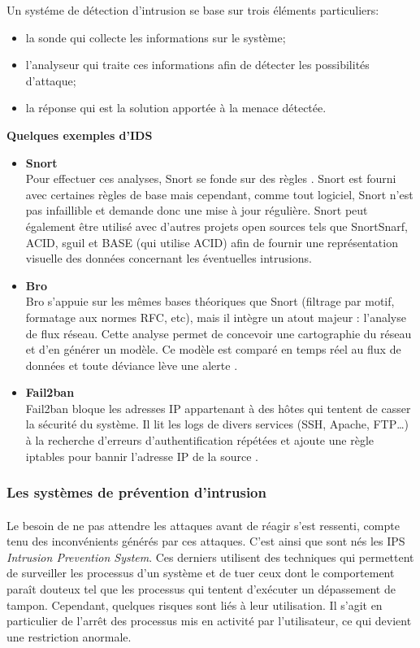     Un systéme de détection d'intrusion se base sur trois éléments particuliers:
    \begin{itemize}
      \item la sonde qui collecte les informations sur le système;
      \item l'analyseur qui traite ces informations afin de détecter les possibilités d'attaque;
      \item la réponse qui est la solution apportée à la menace détectée.
    \end{itemize}    

    \textbf{Quelques exemples d'IDS}
    
  \begin{itemize}
    \item \textbf{Snort}\\
      Pour effectuer ces analyses, Snort se fonde sur des règles \cite{d}. Snort est fourni avec certaines règles de base mais cependant, comme tout logiciel, Snort n'est pas infaillible et demande donc une mise à jour régulière. Snort peut également être utilisé avec d'autres projets open sources tels que SnortSnarf, ACID, sguil et BASE (qui utilise ACID) afin de fournir une représentation visuelle des données concernant les éventuelles intrusions.

    \item \textbf{Bro}\\
      Bro s'appuie sur les mêmes bases théoriques que Snort (filtrage par motif, formatage aux normes RFC, etc), mais il intègre un atout majeur : l'analyse de flux réseau. Cette analyse permet de concevoir une cartographie du réseau et d'en générer un modèle. Ce modèle est comparé en temps réel au flux de données et toute déviance lève une alerte \cite{h}.

    \item \textbf{Fail2ban}\\
      Fail2ban bloque les adresses IP appartenant à des hôtes qui tentent de casser la sécurité du système. Il lit les logs de divers services (SSH, Apache, FTP…) à la recherche d'erreurs d'authentification répétées et ajoute une règle iptables pour bannir l'adresse IP de la source \cite{i}.
  \end{itemize}

      \subsubsection{Les systèmes de prévention d'intrusion}
	\paragraph{} 
	  Le besoin de ne pas attendre les attaques avant de réagir s'est ressenti, compte tenu des inconvénients générés par ces attaques. C'est ainsi que sont nés les IPS \textit{Intrusion Prevention System}. Ces derniers utilisent des techniques qui permettent de surveiller les processus d’un système et de tuer ceux dont le comportement paraît douteux tel que les processus qui tentent d’exécuter un dépassement de tampon. Cependant, quelques risques sont liés à leur utilisation. Il s'agit en particulier de l'arrêt des processus mis en activité par l'utilisateur, ce qui devient une restriction anormale.
		
